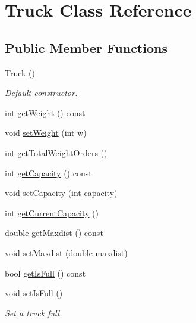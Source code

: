 \hypertarget{class_truck}{}\section{Truck Class Reference}
\label{class_truck}
\subsection*{Public Member Functions}
\begin{DoxyCompactItemize}
\item 
\mbox{\label{class_truck_a87e358bca8fe34e6299c6ff233afb08b}} 
\hyperlink{class_truck_a87e358bca8fe34e6299c6ff233afb08b}{Truck} ()
\begin{DoxyCompactList}\small\item\em Default constructor. \end{DoxyCompactList}\item 
int \hyperlink{class_truck_a91423efd30332b934bc3114ffccd4816}{get\+Weight} () const
\item 
void \hyperlink{class_truck_acd688c98b6052bd720ade2e8eb8b3c8e}{set\+Weight} (int w)
\item 
int \hyperlink{class_truck_aaf7fec768243188128d40344216daeaf}{get\+Total\+Weight\+Orders} ()
\item 
int \hyperlink{class_truck_a412e4de460eda1dc2100ecc1e47fb368}{get\+Capacity} () const
\item 
void \hyperlink{class_truck_ac4491b8f4aac4f0fe4e45126fc29fb5f}{set\+Capacity} (int capacity)
\item 
int \hyperlink{class_truck_a97ab69fced09f49cf05cf50712e15342}{get\+Current\+Capacity} ()
\item 
double \hyperlink{class_truck_a89b2c4e211f4477caa7609b1f8622712}{get\+Maxdist} () const
\item 
void \hyperlink{class_truck_a90bcc83666d4722838bf3ccfc87b4bfd}{set\+Maxdist} (double maxdist)
\item 
bool \hyperlink{class_truck_abc77aa027e9bd1c5bbaf0f35ed73d375}{get\+Is\+Full} () const
\item 
\mbox{\label{class_truck_a3af6004bbd86aa697b9d7ffb63a158ae}} 
void \hyperlink{class_truck_a3af6004bbd86aa697b9d7ffb63a158ae}{set\+Is\+Full} ()
\begin{DoxyCompactList}\small\item\em Set a truck full. \end{DoxyCompactList}\item 

\end{DoxyCompactItemize}
